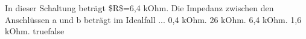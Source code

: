     {In dieser Schaltung beträgt \$R\$=6,4 kOhm. Die Impedanz zwischen den Anschlüssen a und b beträgt im Idealfall ...}
    {0,4 kOhm.}
    {26 kOhm.}
    {6,4 kOhm.}
    {1,6 kOhm.}
    {true}{false}